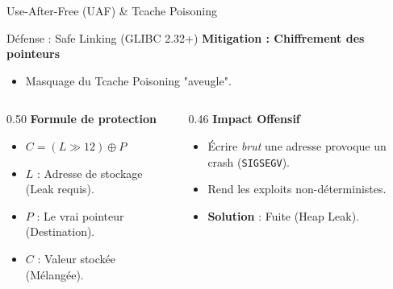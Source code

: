 \documentclass[10pt]{beamer}
\begin{document}
\begin{frame}[fragile]{Use-After-Free (UAF) \& Tcache Poisoning}
\begin{minipage}[t]{0.42\textwidth}
    \end{minipage}
\end{frame}

\begin{frame}[fragile]{Défense : Safe Linking (GLIBC 2.32+)}
    \textbf{Mitigation : Chiffrement des pointeurs}
    \begin{itemize}
        \item Masquage du Tcache Poisoning "aveugle".
    \end{itemize}
    \vspace{0.1em}

    \begin{columns}[T]
        \begin{column}{0.50\textwidth}
            \textbf{Formule de protection}
            \begin{itemize}
                \item $C = (L \gg 12) \oplus P$
                \item $L$ : Adresse de stockage (Leak requis).
                \item $P$ : Le vrai pointeur (Destination).
                \item $C$ : Valeur stockée (Mélangée).
            \end{itemize}
        \end{column}

        \begin{column}{0.46\textwidth}
            \textbf{Impact Offensif}
            \begin{itemize}
                \item Écrire \textit{brut} une adresse provoque un crash (\texttt{SIGSEGV}).
                \item Rend les exploits non-déterministes.
                \item \textbf{Solution} : Fuite (Heap Leak).
            \end{itemize}
        \end{column}
    \end{columns}
\end{frame}
\end{document}
